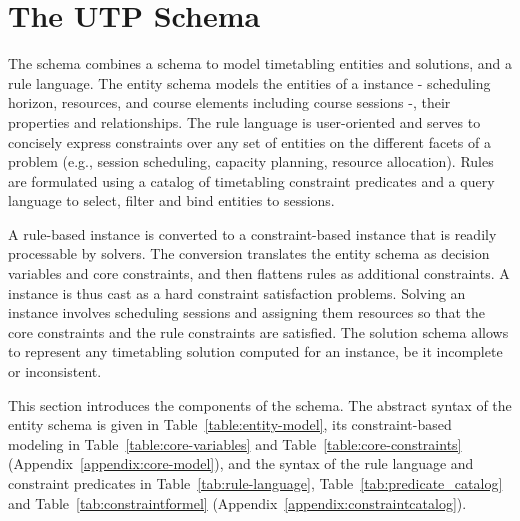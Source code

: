 \section{The UTP Schema}
\label{sec:schema}
The \UTP{} schema %
combines a schema to model timetabling entities and solutions, 
and a rule language.
The entity schema %
models the entities of a \UTP{} instance
- scheduling horizon, resources, and course elements including course sessions -,
their properties and relationships.
The rule language is user-oriented
and serves to concisely express constraints
over any set of entities
on the different facets of a problem (e.g., session scheduling, capacity planning, resource allocation).
Rules are %
formulated
using a catalog of timetabling constraint predicates
and a query language to select, filter and bind entities to sessions. 
 

A rule-based \UTP{} instance is 
converted
to a constraint-based instance
that is readily processable by solvers.
The conversion 
translates the entity schema as decision variables and core constraints, and then flattens rules as additional constraints.
A \UTP{} instance is thus cast as a hard constraint satisfaction problems.
Solving an instance involves scheduling sessions
and assigning them resources 
so that the core constraints and the rule constraints are satisfied.
The solution schema allows to represent
any timetabling solution computed for an instance,
be it incomplete or inconsistent.

This section introduces
the components of the schema.
The abstract syntax of the entity schema
is given in Table~\ref{table:entity-model},
its constraint-based modeling in
Table~\ref{table:core-variables} and
Table~\ref{table:core-constraints}
(Appendix~\ref{appendix:core-model}),
and the syntax of the rule language
and constraint predicates in
Table~\ref{tab:rule-language},
Table~\ref{tab:predicate_catalog} and
Table~\ref{tab:constraintformel}
(Appendix~\ref{appendix:constraintcatalog}).





% 
